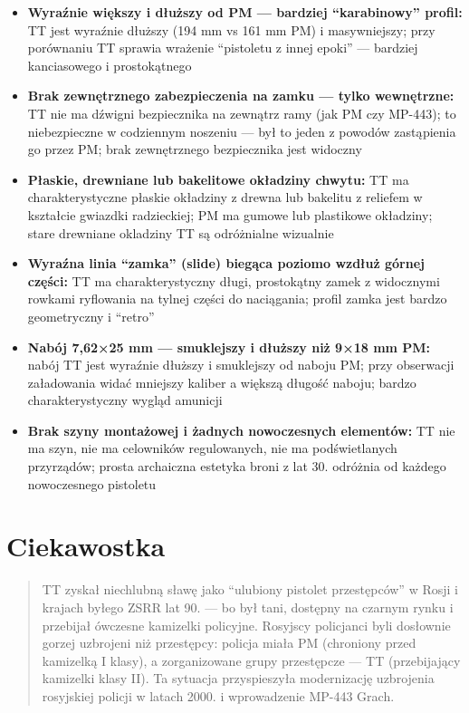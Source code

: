 \documentclass[12pt,openany,oneside]{book}
\providecommand{\tightlist}{%
  \setlength{\itemsep}{0pt}\setlength{\parskip}{0pt}}
\begin{document}
\begin{itemize}
\tightlist
\item
  \textbf{Wyraźnie większy i dłuższy od PM --- bardziej ``karabinowy''
  profil:} TT jest wyraźnie dłuższy (194 mm vs 161 mm PM) i
  masywniejszy; przy porównaniu TT sprawia wrażenie ``pistoletu z innej
  epoki'' --- bardziej kanciasowego i prostokątnego
\item
  \textbf{Brak zewnętrznego zabezpieczenia na zamku --- tylko
  wewnętrzne:} TT nie ma dźwigni bezpiecznika na zewnątrz ramy (jak PM
  czy MP-443); to niebezpieczne w codziennym noszeniu --- był to jeden z
  powodów zastąpienia go przez PM; brak zewnętrznego bezpiecznika jest
  widoczny
\item
  \textbf{Płaskie, drewniane lub bakelitowe okładziny chwytu:} TT ma
  charakterystyczne płaskie okładziny z drewna lub bakelitu z reliefem w
  kształcie gwiazdki radzieckiej; PM ma gumowe lub plastikowe okładziny;
  stare drewniane okladziny TT są odróżnialne wizualnie
\item
  \textbf{Wyraźna linia ``zamka'' (slide) biegąca poziomo wzdłuż górnej
  części:} TT ma charakterystyczny długi, prostokątny zamek z widocznymi
  rowkami ryflowania na tylnej części do naciągania; profil zamka jest
  bardzo geometryczny i ``retro''
\item
  \textbf{Nabój 7,62×25 mm --- smuklejszy i dłuższy niż 9×18 mm PM:}
  nabój TT jest wyraźnie dłuższy i smuklejszy od naboju PM; przy
  obserwacji załadowania widać mniejszy kaliber a większą długość
  naboju; bardzo charakterystyczny wygląd amunicji
\item
  \textbf{Brak szyny montażowej i żadnych nowoczesnych elementów:} TT
  nie ma szyn, nie ma celowników regulowanych, nie ma podświetlanych
  przyrządów; prosta archaiczna estetyka broni z lat 30. odróżnia od
  każdego nowoczesnego pistoletu
\end{itemize}

\section{Ciekawostka}\label{ciekawostka-87}

\begin{quote}
TT zyskał niechlubną sławę jako ``ulubiony pistolet przestępców'' w
Rosji i krajach byłego ZSRR lat 90. --- bo był tani, dostępny na czarnym
rynku i przebijał ówczesne kamizelki policyjne. Rosyjscy policjanci byli
dosłownie gorzej uzbrojeni niż przestępcy: policja miała PM (chroniony
przed kamizelką I klasy), a zorganizowane grupy przestępcze --- TT
(przebijający kamizelki klasy II). Ta sytuacja przyspieszyła
modernizację uzbrojenia rosyjskiej policji w latach 2000. i wprowadzenie
MP-443 Grach.
\end{quote}
\end{document}
